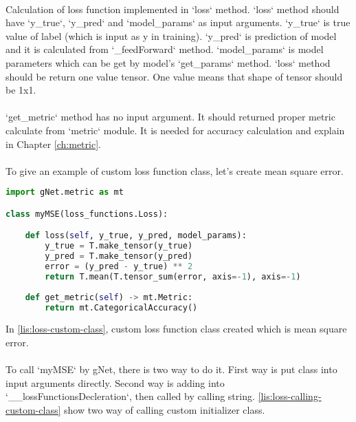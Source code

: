 \documentclass[12pt]{report}
\begin{document}
\paragraph{}
Calculation of loss function implemented in `loss` method. `loss` method should have `y\_true`, `y\_pred` and `model\_params` as input arguments. `y\_true` is true value of label (which is input as y in training). `y\_pred` is prediction of model and it is calculated from `\_feedForward` method. `model\_params` is model parameters which can be get by model's `get\_params` method. `loss` method should be return one value tensor. One value means that shape of tensor should be 1x1.  

\paragraph{}
`get\_metric` method has no input argument. It should returned proper metric calculate from `metric` module. It is needed for accuracy calculation and explain in Chapter \ref{ch:metric}.

\paragraph{}
To give an example of custom loss function class, let's create mean square error. 


\begin{lstlisting}[language=Python, numbers=none, caption={Custom loss function class.}, label={lis:loss-custom-class}]
import gNet.metric as mt

class myMSE(loss_functions.Loss):

	def loss(self, y_true, y_pred, model_params):  
		y_true = T.make_tensor(y_true)
		y_pred = T.make_tensor(y_pred)
		error = (y_pred - y_true) ** 2
		return T.mean(T.tensor_sum(error, axis=-1), axis=-1)
	
	def get_metric(self) -> mt.Metric:
		return mt.CategoricalAccuracy()

\end{lstlisting}

In \ref{lis:loss-custom-class}, custom loss function class created which is mean square error. 

\paragraph{}
To call `myMSE` by gNet, there is two way to do it. First way is put class into input arguments directly. Second way is adding into  `\_\_lossFunctionsDecleration`, then called by calling string. \ref{lis:loss-calling-custom-class} show two way of calling custom initializer class.
\end{document}
